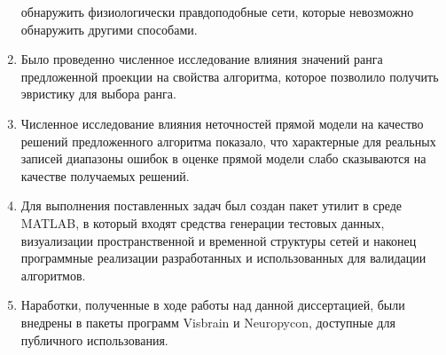 \begin{enumerate}
      обнаружить физиологически правдоподобные сети, которые невозможно обнаружить
      другими способами.
  \item Было проведенно численное исследование влияния значений ранга предложенной проекции
      на свойства алгоритма, которое позволило получить эвристику для выбора ранга.
  \item Численное исследование влияния неточностей прямой модели на качество решений
      предложенного алгоритма показало, что характерные для реальных записей
      диапазоны ошибок в оценке прямой модели слабо сказываются на качестве
      получаемых решений.
  \item Для выполнения поставленных задач был создан
      пакет утилит в среде MATLAB, в который входят средства генерации тестовых
      данных, визуализации пространственной и временной структуры сетей и наконец
      программные реализации разработанных и использованных для валидации алгоритмов.
  \item Наработки, полученные в ходе работы над данной диссертацией,
      были внедрены в пакеты программ Visbrain и Neuropycon, доступные для публичного
      использования.
\end{enumerate}
